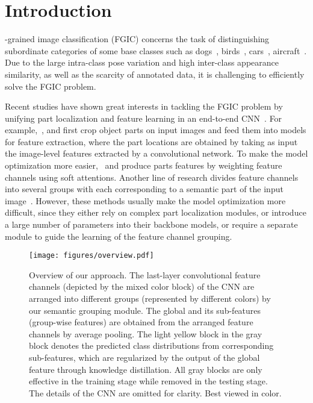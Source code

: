 \documentclass[journal]{IEEEtran}
\begin{document}
\IEEEpeerreviewmaketitle

\section{Introduction}
\label{sec:intro}
-grained image classification (FGIC) concerns the task of distinguishing subordinate categories of some base classes such as dogs~\cite{stdogs11feifei}, birds~\cite{cubbirds11caltech}, cars~\cite{stcars13feifei}, aircraft~\cite{vggaircraft13Vedaldi}. Due to the large intra-class pose variation and high inter-class appearance similarity, as well as the scarcity of annotated data, it is challenging to efficiently solve the FGIC problem. 


Recent studies have shown great interests in tackling the FGIC problem by unifying part localization and feature learning in an end-to-end CNN~\cite{racnn@mei,macnn@mei,dfbnet18larry,mamc18eccv,trilinear_attention@luojiebo,s3n@19iccv,dbtnet@19nips}. For example,~\cite{fcan@lin,ntscnn@eccv}, and \cite{racnn@mei} first crop object parts on input images and feed them into models for feature extraction, where the part locations are obtained by taking as input the image-level features extracted by a convolutional network. To make the model optimization more easier,~\cite{mamc18eccv} and \cite{crossx@luowei} produce parts features by weighting feature channels using soft attentions. 
Another line of research divides feature channels into several groups with each corresponding to a semantic part of the input image~\cite{macnn@mei,trilinear_attention@luojiebo}. However, these methods usually make the model optimization more difficult, since they either rely on complex part localization modules, or introduce a large number of parameters into their backbone models, or require a separate module to guide the learning of the feature channel grouping. 




\begin{figure*}[t]
\centering
\texttt{[image: figures/overview.pdf]}
\caption{Overview of our approach. The last-layer convolutional feature channels (depicted by the mixed color block) of the CNN are arranged into different groups (represented by different colors) by our semantic grouping module. The global and its sub-features (group-wise features) are obtained from the arranged feature channels by average pooling. The light yellow block in the gray block denotes the predicted class distributions from corresponding sub-features, which are regularized by the output of the global feature through knowledge distillation. All gray blocks are only effective in the training stage while removed in the testing stage. The details of the CNN are omitted for clarity. Best viewed in color. }
\label{fig:overview}
\end{figure*}
\end{document}
